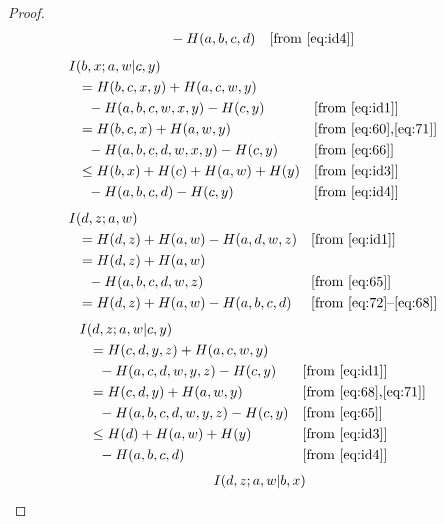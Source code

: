 \documentclass[10pt,journal]{IEEEtran}
\begin{document}
\begin{proof}
\begin{align}
             &\ \ \ \  - H(a,b,c,d)                & & [\mbox{from \eqref{eq:id4}}]
\end{align}
%
\begin{align}
&   I(b,x;a,w|c,y) \notag\\
             &\ \ = H(b,c,x,y) + H(a,c,w,y)\notag\\
             &\ \ \ \  - H(a,b,c,w,x,y) - H(c,y)    & & [\mbox{from \eqref{eq:id1}}] \notag\\
             &\ \ = H(b,c,x) + H(a,w,y)             & & [\mbox{from \eqref{eq:60},\eqref{eq:71}}]\notag\\
             &\ \ \ \  - H(a,b,c,d,w,x,y) - H(c,y)  & & [\mbox{from \eqref{eq:66}}] \notag\\
             &\ \ \le H(b,x) + H(c) + H(a,w) + H(y) & & [\mbox{from \eqref{eq:id3}}] \notag\\
             &\ \ \ \  - H(a,b,c,d) - H(c,y)        & & [\mbox{from \eqref{eq:id4}}]
\end{align}
%
\begin{align}
&   I(d,z;a,w) \notag\\
             &\ \ = H(d,z) + H(a,w) - H(a,d,w,z)     & & [\mbox{from \eqref{eq:id1}}] \notag\\
             &\ \ = H(d,z) + H(a,w)\notag\\
             &\ \ \ \  - H(a,b,c,d,w,z) & & [\mbox{from \eqref{eq:65}}] \notag\\
             &\ \ = H(d,z) + H(a,w) - H(a,b,c,d)     & & [\mbox{from \eqref{eq:72}--\eqref{eq:68}}] \notag\\
\end{align}
%
\begin{align}
&   I(d,z;a,w|c,y) \notag\\
             &\ \ = H(c,d,y,z) + H(a,c,w,y)\notag\\
             &\ \ \ \  - H(a,c,d,w,y,z) - H(c,y)    & & [\mbox{from \eqref{eq:id1}}] \notag\\
             &\ \ = H(c,d,y) + H(a,w,y)             & & [\mbox{from \eqref{eq:68},\eqref{eq:71}}]\notag\\
             &\ \ \ \  - H(a,b,c,d,w,y,z) - H(c,y)  & & [\mbox{from \eqref{eq:65}}]\notag\\
             &\ \ \le H(d) + H(a,w) + H(y)          & & [\mbox{from \eqref{eq:id3}}] \notag\\
             &\ \ \ \  - H(a,b,c,d)                 & & [\mbox{from \eqref{eq:id4}}]
\end{align}
%
\begin{align}
&   I(d,z;a,w|b,x) \notag\\

\end{align}
\end{proof}
\end{document}
